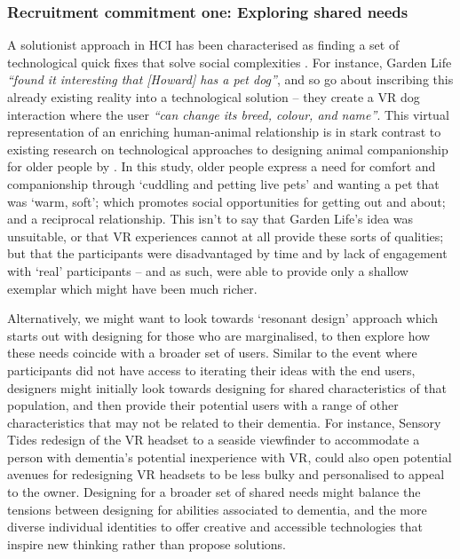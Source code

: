 \subsubsection{Recruitment commitment one: Exploring shared needs }
\label{DiscussionOne:CommitOne}
A solutionist approach in HCI has been characterised as finding a set of technological quick fixes that solve social complexities \citep{cramer2014save}. For instance, Garden Life \textit{``found it interesting that [Howard] has a pet dog''}, and so go about inscribing this already existing reality into a technological solution – they create a VR dog interaction where the user \textit{``can change its breed, colour, and name''}. This virtual representation of an enriching human-animal relationship is in stark contrast to existing research on technological approaches to designing animal companionship for older people by \cite{lazar_rethinking_2016}. In this study, older people express a need for comfort and companionship through ‘cuddling and petting live pets’ and wanting a pet that was ‘warm, soft’; which promotes social opportunities for getting out and about; and a reciprocal relationship. This isn’t to say that Garden Life’s idea was unsuitable, or that VR experiences cannot at all provide these sorts of qualities; but that the participants were disadvantaged by time and by lack of engagement with `real' participants – and as such, were able to provide only a shallow exemplar which might have been much richer.

Alternatively, we might want to look towards \cite{pullin2009design} ‘resonant design’ approach which starts out with designing for those who are marginalised, to then explore how these needs coincide with a broader set of users. Similar to the event where participants did not have access to iterating their ideas with the end users, designers might initially look towards designing for shared characteristics of that population, and then provide their potential users with a range of other characteristics that may not be related to their dementia. For instance, Sensory Tides redesign of the VR headset to a seaside viewfinder to accommodate a person with dementia’s potential inexperience with VR, could also open potential avenues for redesigning VR headsets to be less bulky and personalised to appeal to the owner. Designing for a broader set of shared needs might balance the tensions between designing for abilities associated to dementia, and the more diverse individual identities to offer creative and accessible technologies that inspire new thinking rather than propose solutions.

